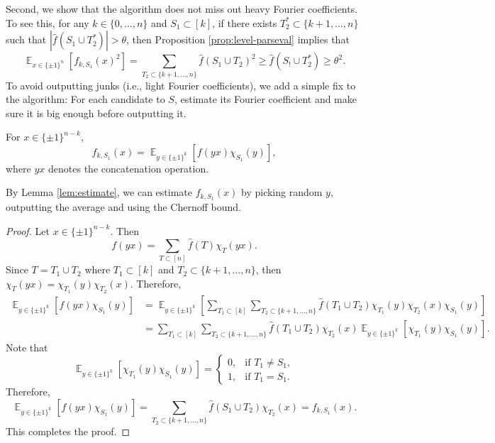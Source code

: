 \documentclass[letterpaper, reqno,11pt]{article}
\newcommand{\EE}{\mathop{{}\mathbb{E}}}
\begin{document}
Second, we show that the algorithm does not miss out heavy Fourier coefficients. To see this, for any $k \in \{ 0, \ldots, n \}$ and $S_1 \subset [k]$, if there exists $T_2^* \subset \{ k + 1, \ldots, n \}$ such that $|\hat{f}(S_1 \cup T_2^*)| > \theta$, then Proposition \ref{prop:level-parseval} implies that
$$ \EE_{x \in \{ \pm 1 \}^n}\left[f_{k, S_1}(x)^2\right] = \sum_{T_2 \subset \{ k + 1, \ldots, n \}} \hat{f}\left(S_1 \cup T_2\right)^2 \geq \hat{f}\left(S_! \cup T_2^*\right) \geq \theta^2. $$
To avoid outputting junks (i.e., light Fourier coefficients), we add a simple fix to the algorithm: For each candidate to $S$, estimate its Fourier coefficient and make sure it is big enough before outputting it.

\begin{lemma} \label{lem:estimate}
  For $x \in \{ \pm 1 \}^{n - k}$,
  $$ f_{k, S_1}(x) = \EE_{y \in \{ \pm 1 \}^k}\left[f(yx) \chi_{S_1}(y)\right], $$
  where $yx$ denotes the concatenation operation.
\end{lemma}

By Lemma \ref{lem:estimate}, we can estimate $f_{k, S_1}(x)$ by picking random $y$, outputting the average and using the Chernoff bound.

\begin{proof}
  Let $x \in \{ \pm 1 \}^{n - k}$. Then
  $$ f(yx) = \sum_{T \subset [n]} \hat{f}(T) \chi_T(yx). $$
  Since $T = T_1 \cup T_2$ where $T_1 \subset [k]$ and $T_2 \subset \{ k + 1, \ldots, n\}$, then $\chi_T(yx) = \chi_{T_1}(y) \chi_{T_2}(x)$. Therefore,
  \begin{align*}
    \EE_{y \in \{ \pm 1 \}^k}\left[f(yx) \chi_{S_1}(y)\right] &= \EE_{y \in \{ \pm 1 \}^k}\left[\sum_{T_1 \subset [k]} \sum_{T_2 \subset \{ k + 1, \ldots, n \}} \hat{f}\left(T_1 \cup T_2\right) \chi_{T_1}(y) \chi_{T_2}(x) \chi_{S_1}(y)\right] \\
    &= \sum_{T_1 \subset [k]} \sum_{T_2 \subset \{ k + 1, \ldots, n \}} \hat{f}\left(T_1 \cup T_2\right) \chi_{T_2}(x) \EE_{y \in \{ \pm 1 \}^k}\left[\chi_{T_1}(y) \chi_{S_1}(y)\right].
  \end{align*}
  Note that
  $$ \EE_{y \in \{ \pm 1 \}^k}\left[\chi_{T_1}(y) \chi_{S_1}(y)\right] = \left\{
    \begin{array}{ll}
      0, & \text{if $T_1 \neq S_1$}, \\
      1, & \text{if $T_1 = S_1$}.
    \end{array}
  \right. $$
  Therefore,
  $$ \EE_{y \in \{ \pm 1 \}^k}\left[f(yx) \chi_{S_1}(y)\right] = \sum_{T_2 \subset \{ k + 1, \ldots, n \}} \hat{f}\left(S_1 \cup T_2\right) \chi_{T_2}(x) = f_{k, S_1}(x). $$
  This completes the proof.
\end{proof}
\end{document}
